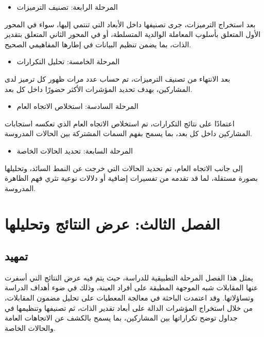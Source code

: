 \documentclass[12pt,oneside]{report}
\begin{document}
\begin{itemize}[leftmargin=1.6em,itemsep=1pt]
\item المرحلة الرابعة: تصنيف الترميزات
\end{itemize}
بعد استخراج الترميزات، جرى تصنيفها داخل الأبعاد التي تنتمي إليها، سواء في المحور الأول المتعلق بأسلوب المعاملة الوالدية المتسلطة، أو في المحور الثاني المتعلق بتقدير الذات، بما يضمن تنظيم البيانات في إطارها المفاهيمي الصحيح.

\begin{itemize}[leftmargin=1.6em,itemsep=1pt]
\item المرحلة الخامسة: تحليل التكرارات
\end{itemize}
بعد الانتهاء من تصنيف الترميزات، تم حساب عدد مرات ظهور كل ترميز لدى المشاركين، بهدف تحديد المؤشرات الأكثر حضورًا داخل كل بعد.

\begin{itemize}[leftmargin=1.6em,itemsep=1pt]
\item المرحلة السادسة: استخلاص الاتجاه العام
\end{itemize}
اعتمادًا على نتائج التكرارات، تم استخلاص الاتجاه العام الذي تعكسه استجابات المشاركين داخل كل بعد، بما يسمح بفهم السمات المشتركة بين الحالات المدروسة.

\begin{itemize}[leftmargin=1.6em,itemsep=1pt]
\item المرحلة السابعة: تحديد الحالات الخاصة
\end{itemize}
إلى جانب الاتجاه العام، تم تحديد الحالات التي خرجت عن النمط السائد، وتحليلها بصورة مستقلة، لما قد تقدمه من تفسيرات إضافية أو دلالات نوعية تثري فهم الظاهرة المدروسة.

\chapter*{الفصل الثالث: عرض النتائج وتحليلها}
\section*{تمهيد}
يمثل هذا الفصل المرحلة التطبيقية للدراسة، حيث يتم فيه عرض النتائج التي أسفرت عنها المقابلات شبه الموجهة المطبقة على أفراد العينة، وذلك في ضوء أهداف الدراسة وتساؤلاتها. وقد اعتمدت الباحثة في معالجة المعطيات على تحليل مضمون المقابلات، من خلال استخراج المؤشرات الدالة على أبعاد تقدير الذات، ثم تصنيفها وتنظيمها في جداول توضح تكراراتها بين المشاركين، بما يسمح بالكشف عن الاتجاهات العامة والحالات الخاصة.
\end{document}
